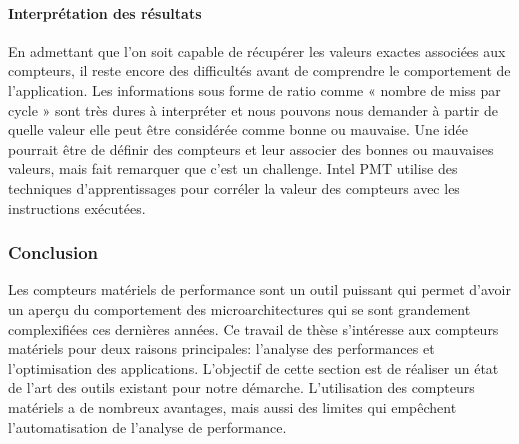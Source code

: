             
        \paragraph{Interprétation des résultats}
            En admettant que l'on soit capable de récupérer les valeurs exactes associées aux compteurs, il reste encore des difficultés avant de comprendre le comportement de l'application. Les informations sous forme de ratio comme « nombre de miss par cycle » sont très dures à interpréter et nous pouvons nous demander à partir de quelle valeur elle peut être considérée comme bonne ou mauvaise. Une idée pourrait être de définir des compteurs et leur associer des bonnes ou mauvaises valeurs, mais \cite{Moseley2011} fait remarquer que c'est un challenge. Intel PMT \cite{RobertD.2011} utilise des techniques d'apprentissages pour corréler la valeur des compteurs avec les instructions exécutées.
            
             
                
    
    \subsubsection{Conclusion}

        Les compteurs matériels de performance sont un outil puissant qui permet d'avoir un aperçu du comportement des microarchitectures qui se sont grandement complexifiées ces dernières années. Ce travail de thèse s'intéresse aux compteurs matériels pour deux raisons principales: l'analyse des performances et l'optimisation des applications. L'objectif de cette section est de réaliser un état de l'art des outils existant pour notre démarche. L'utilisation des compteurs matériels a de nombreux avantages, mais aussi des limites qui empêchent l'automatisation de l'analyse de performance. 

